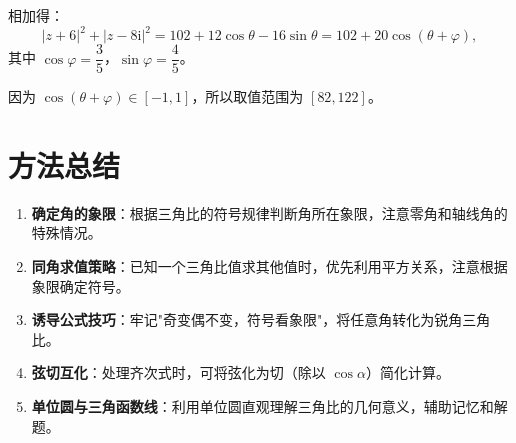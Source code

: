 \documentclass[11pt]{ctexrep}
\begin{document}
相加得：
\[
    |z + 6|^2 + |z - 8\mathrm{i}|^2 = 102 + 12\cos\theta - 16\sin\theta = 102 + 20\cos(\theta + \varphi),
\]
其中 $\cos\varphi = \dfrac{3}{5}$，$\sin\varphi = \dfrac{4}{5}$。

因为 $\cos(\theta + \varphi) \in [-1, 1]$，所以取值范围为 $[82, 122]$。

\section*{方法总结}

\begin{enumerate}
    \item \textbf{确定角的象限}：根据三角比的符号规律判断角所在象限，注意零角和轴线角的特殊情况。
    \item \textbf{同角求值策略}：已知一个三角比值求其他值时，优先利用平方关系，注意根据象限确定符号。
    \item \textbf{诱导公式技巧}：牢记"奇变偶不变，符号看象限"，将任意角转化为锐角三角比。
    \item \textbf{弦切互化}：处理齐次式时，可将弦化为切（除以 $\cos\alpha$）简化计算。
    \item \textbf{单位圆与三角函数线}：利用单位圆直观理解三角比的几何意义，辅助记忆和解题。
\end{enumerate}
\end{document}
